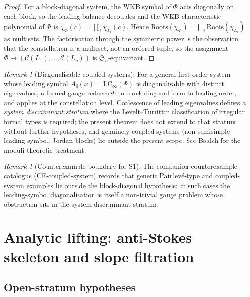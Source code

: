 \documentclass[aip,jmp,preprint,amsmath,amssymb,nofootinbib,floatfix]{revtex4-2}
\theoremstyle{plain}
\theoremstyle{definition}
\theoremstyle{remark}
\newtheorem{remark}[theorem]{Remark}
\newcommand{\LCinf}{\mathrm{LC}_\infty}
\newcommand{\Roots}{\mathrm{Roots}}
\newcommand{\Cl}{\mathcal{C}}
\newcommand{\Symm}{\mathfrak{S}}
\begin{document}
\begin{proof}
For a block-diagonal system, the WKB symbol of $\Phi$ acts diagonally on
each block, so the leading balance decouples and the WKB characteristic
polynomial of $\Phi$ is $\chi_\Phi(c) = \prod_i \chi_{L_i}(c)$. Hence
$\Roots(\chi_\Phi) = \bigsqcup_i \Roots(\chi_{L_i})$ as multisets. The
factorisation through the symmetric power is the observation that the
constellation is a multiset, not an ordered tuple, so the assignment
$\Phi \mapsto (\Cl(L_1), \dots, \Cl(L_n))$ is $\Symm_n$-equivariant.
\end{proof}

\begin{remark}[Diagonalisable coupled systems]\label{rem:S1-diag}
For a general first-order system whose leading symbol $A_0(x) =
\LCinf(\Phi)$ is diagonalisable with distinct eigenvalues, a formal gauge
reduces $\Phi$ to block-diagonal form to leading order, and
 applies at the constellation level. Coalescence of leading
eigenvalues defines a \emph{system discriminant stratum} where the
Levelt--Turrittin classification of irregular formal types is required;
the present theorem does not extend to that stratum without further
hypotheses, and genuinely coupled systems (non-semisimple leading symbol,
Jordan blocks) lie outside the present scope. See Boalch
\cite{boalch-stokes,boalch-wildhodge} for the moduli-theoretic treatment.
\end{remark}

\begin{remark}[Counterexample boundary for S1]\label{rem:S1-counter}
The companion counterexample catalogue (CE-coupled-system) records that
generic Painlev{\'e}-type and coupled-system examples lie outside the
block-diagonal hypothesis; in such cases the leading-symbol diagonalisation
is itself a non-trivial gauge problem whose obstruction sits in the
system-discriminant stratum.
\end{remark}


\section{Analytic lifting: anti-Stokes skeleton and slope filtration}\label{sec:analytic}

\subsection{Open-stratum hypotheses}\label{ssec:OS}
\end{document}
